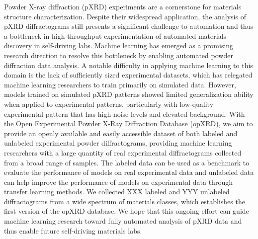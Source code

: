 Powder X-ray diffraction (pXRD) experiments are a cornerstone for materials structure characterization.
Despite their widespread application, the analysis of pXRD diffractograms still presents a significant challenge to automation and thus a bottleneck in high-throughput experimentation of automated materials discovery in self-driving labs.
Machine learning has emerged as a promising research direction to resolve this bottleneck by enabling automated powder diffraction data analysis.
A notable difficulty in applying machine learning to this domain is the lack of sufficiently sized experimental datasets, which has relegated machine learning researchers to train primarily on simulated data. However, models trained on simulated pXRD patterns showed limited generalization ability when applied to experimental patterns, particularly with low-quality experimental pattern that has high noise levels and elevated background.
With the Open Experimental Powder X-Ray Diffraction Database (opXRD), we aim to provide an openly available and easily accessible dataset of both labeled and unlabeled experimental powder diffractograms, providing machine learning researchers with a large quantity of real experimental diffractograms collected from a broad range of samples. The labeled data can be used as a benchmark to evaluate the performance of models on real experimental data and unlabeled data can help improve the performance of models on experimental data through transfer learning methods. 
We collected XXX labeled and YYY unlabeled diffractograms from a wide spectrum of materials classes, which establishes the first version of the opXRD database.
We hope that this ongoing effort can guide machine learning research toward fully automated analysis of pXRD data and thus enable future self-driving materials labs.